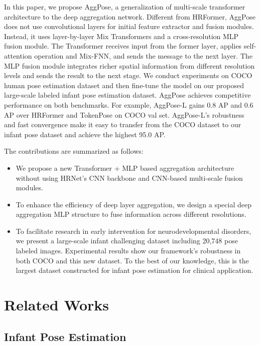 \documentclass{article}
\begin{document}
In this paper, we propose AggPose, a generalization of multi-scale transformer architecture to the deep aggregation network. Different from HRFormer, AggPose does not use convolutional layers for initial feature extractor and fusion modules. Instead, it uses layer-by-layer Mix Transformers and a cross-resolution MLP fusion module. The Transformer receives input from the former layer, applies self-attention operation and Mix-FNN, and sends the message to the next layer. The MLP fusion module integrates richer spatial information from different resolution levels and sends the result to the next stage.
We conduct experiments on COCO human pose estimation dataset and then fine-tune the model on our proposed large-scale labeled infant pose estimation dataset. AggPose achieves competitive performance on both benchmarks. For example, AggPose-L gains 0.8 AP and 0.6 AP over HRFormer and TokenPose on COCO val set. AggPose-L's robustness and fast convergence make it easy to transfer from the COCO dataset to our infant pose dataset and achieve the highest 95.0 AP.

The contributions are summarized as follows:

\begin{itemize}
\item We propose a new Transformer + MLP based aggregation architecture without using HRNet's CNN backbone and CNN-based multi-scale fusion modules.
\item To enhance the efficiency of deep layer aggregation, we design a special deep aggregation MLP structure to fuse information across different resolutions.
\item To facilitate research in early intervention for neurodevelopmental disorders, we present a large-scale infant challenging dataset including 20,748 pose labeled images. Experimental results show our framework's robustness in both COCO and this new dataset. To the best of our knowledge, this is the largest dataset constructed for infant pose estimation for clinical application.
\end{itemize}


\section{Related Works}

\subsection{Infant Pose Estimation}
\end{document}
